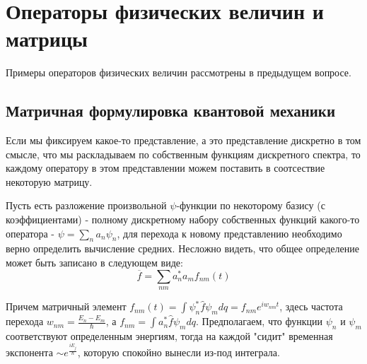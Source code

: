 \newpage
\chapter{Операторы физических величин и матрицы}
\par Примеры операторов физических величин рассмотрены в предыдущем вопросе.
\section{Матричная формулировка квантовой механики}
\par Если мы фиксируем какое-то представление, а это представление дискретно в том смысле, что мы раскладываем по собственным функциям дискретного спектра, то каждому оператору в этом представлении можем поставить в соотсествие некоторую матрицу.
\par Пусть есть разложение произвольной $\psi$-функции по некоторому базису (с коэффициентами) - полному дискретному набору собственных функций какого-то оператора - $\psi = \sum_{n} a_n\psi_n$, для перехода к новому представлению необходимо верно определить вычисление средних. Несложно видеть, что общее определение может быть записано в следующем виде:
$$\overline{f}=\sum_{nm}a^*_n a_m f_{nm}(t) $$
\par  Причем матричный элемент $f_{nm}(t) = \int \psi^*_n \hat{f}\psi_m dq = f_{nm}e^{iw_{nm}t}$, здесь частота перехода $w_{nm}=\frac{E_n -E_m}{\hbar}$, а $f_{nm}=\int a^*_n \hat{f}\psi_m dq$. Предполагаем, что функции $\psi_n$ и $\psi_m$ соответствуют определенным энергиям, тогда на каждой "сидит" временная экспонента $ \sim e^{\frac{i E_j}{\hbar}} $, которую спокойно вынесли из-под интеграла.

